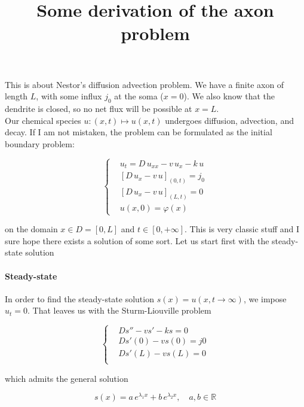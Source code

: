 \documentclass[a4paper, 10pt]{article}
\title{Some derivation of the axon problem}
\author{}
\begin{document}
  \maketitle

  This is about Nestor's diffusion advection problem. We have a finite axon of
  length $L$, with some influx $j_0$ at the soma ($x=0$). We also know that the
  dendrite is closed, so no net flux will be possible at $x=L$.\\
  Our chemical species $u : (x,t) \mapsto u(x,t)$ undergoes diffusion,
  advection, and decay. If I am not mistaken, the problem can be formulated as
  the initial boundary problem:

  \begin{equation}\label{eq:problem}
    \left\{ \begin{aligned}
      &u_t = D \, u_{xx} - v \, u_x - k \, u\\
      &\left[D \, u_x - v \, u\right]_{(0,t)} = j_0\\
      &\left[D \, u_x - v \, u\right]_{(L,t)} = 0\\
      &u(x,0) = \varphi(x)
    \end{aligned}\right.
  \end{equation}
  
  on the domain $x \in D = [0, L]$ and $t \in [0, +\infty]$.
  This is very classic stuff and I sure hope there exists a solution of
  some sort. Let us start first with the steady-state solution

  \paragraph{Steady-state} In order to find the steady-state solution
  $s(x) = u(x, t\to \infty)$, we impose $u_t = 0$. That leaves us with the
  Sturm-Liouville problem

  \begin{equation}
    \left\{\begin{aligned}
      &D s'' - v s' - k s = 0\\
      & D s'(0) - v s(0) = j0 \\
      & D s'(L) - v s(L) = 0 \\
    \end{aligned}\right.
  \end{equation}

  which admits the general solution
  
  \begin{equation}
    s(x) = a \, e^{\lambda_1 x} + b \, e^{\lambda_2 x}, \quad a, b \in \mathbb{R}
  \end{equation}
\end{document}
